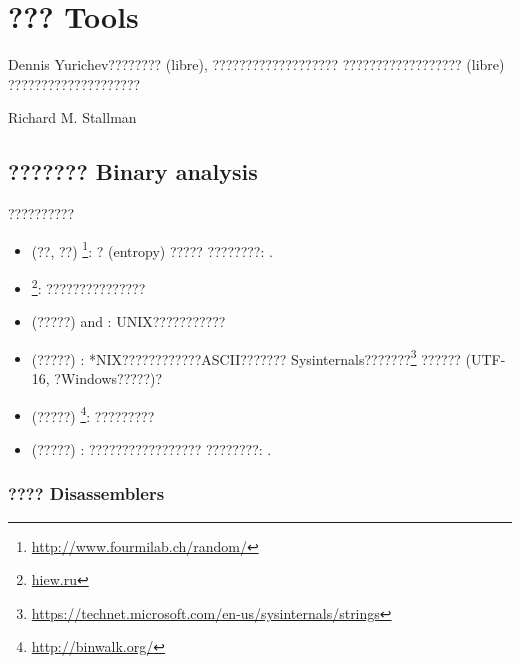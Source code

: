 \chapter{??? Tools}

\epigraph{Dennis Yurichev???????? (libre), ???????????????????
?????????????????? (libre) ????????????????????}{Richard M. Stallman}

\section{??????? Binary analysis}

??????????


\begin{itemize}
\item
(??, ??) \footnote{\url{http://www.fourmilab.ch/random/}}: ? (entropy) ?????
????????: .

\item
\label{Hiew}
\footnote{\href{http://go.yurichev.com/17035}{hiew.ru}}:
???????????????

\item (?????)  and : UNIX???????????


\item (?????) : *NIX????????????ASCII???????
Sysinternals???????\footnote{\url{https://technet.microsoft.com/en-us/sysinternals/strings}}
?????? (UTF-16, ?Windows?????)?

\item (?????) \footnote{\url{http://binwalk.org/}}: ?????????


\item
{}
(?????) :
?????????????????
????????: \BGREPURL.

\end{itemize}

\subsection{???? Disassemblers}

